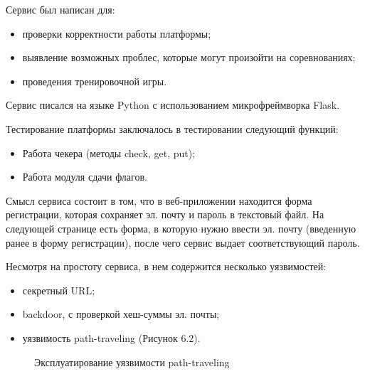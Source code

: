 Сервис был написан для:
\begin{itemize} 
\item проверки корректности работы платформы;
\item выявление возможных проблес, которые могут произойти на соревнованиях;
\item проведения тренировочной игры.
\end{itemize}

Сервис писался на языке Python с использованием микрофреймворка Flask.

Тестирование платформы заключалось в тестировании следующий функций:
\begin{itemize} 
\item Работа чекера (методы check, get, put);
\item Работа модуля сдачи флагов.
\end{itemize}

Смысл сервиса состоит в том, что в веб-приложении находится форма регистрации, которая сохраняет эл. почту и пароль в текстовый файл. На следующей странице есть форма, в которую нужно ввести эл. почту (введенную ранее в форму регистрации), после чего сервис выдает соответствующий пароль.

Несмотря на простоту сервиса, в нем содержится несколько уязвимостей:
\begin{itemize} 
\item секретный URL;
\item backdoor, с проверкой хеш-суммы эл. почты;
\item уязвимость path-traveling (Рисунок 6.2).
\end{itemize}

\begin{figure}[ht!]
\caption{Эксплуатирование уязвимости path-traveling}
\end{figure}